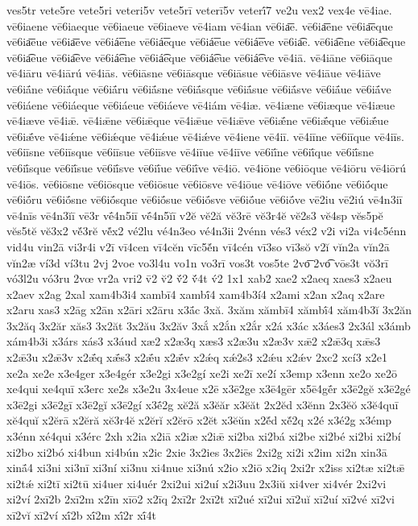 {ves5tr
vete5re
vete5ri
veteri5v
vete5rī
veterī5v
veterī́7
ve2u
vex2
vex4e
vē4iae.
vē6iaene
vē6iaeque
vē6iaeue
vē6iaeve
vē4iam
vē4ian
vē6ia͞e.
vē6ia͞ene
vē6ia͞eque
vē6ia͞eue
vē6ia͞eve
vē6iá͞ene
vē6iá͞eque
vē6iá͞eue
vē6iá͞eve
vē6ia͡e.
vē6ia͡ene
vē6ia͡eque
vē6ia͡eue
vē6ia͡eve
vē6iá͡ene
vē6iá͡eque
vē6iá͡eue
vē6iá͡eve
vē4iā.
vē4iāne
vē6iāque
vē4iāru
vē4iārú
vē4iās.
vē6iāsne
vē6iāsque
vē6iāsue
vē6iāsve
vē4iāue
vē4iāve
vē6iā́ne
vē6iā́que
vē6iā́ru
vē6iā́sne
vē6iā́sque
vē6iā́sue
vē6iā́sve
vē6iā́ue
vē6iā́ve
vē6iáene
vē6iáeque
vē6iáeue
vē6iáeve
vē4iám
vē4iæ.
vē4iæne
vē6iæque
vē4iæue
vē4iæve
vē4iǣ.
vē4iǣne
vē6iǣque
vē4iǣue
vē4iǣve
vē6iǣ́ne
vē6iǣ́que
vē6iǣ́ue
vē6iǣ́ve
vē4iǽne
vē6iǽque
vē4iǽue
vē4iǽve
vē4iene
vē4iī.
vē4iīne
vē6iīque
vē4iīs.
vē6iīsne
vē6iīsque
vē6iīsue
vē6iīsve
vē4iīue
vē4iīve
vē6iī́ne
vē6iī́que
vē6iī́sne
vē6iī́sque
vē6iī́sue
vē6iī́sve
vē6iī́ue
vē6iī́ve
vē4iō.
vē4iōne
vē6iōque
vē4iōru
vē4iōrú
vē4iōs.
vē6iōsne
vē6iōsque
vē6iōsue
vē6iōsve
vē4iōue
vē4iōve
vē6iṓne
vē6iṓque
vē6iṓru
vē6iṓsne
vē6iṓsque
vē6iṓsue
vē6iṓsve
vē6iṓue
vē6iṓve
vē2iu
vē2iú
vē4n3iī
vē4nīs
vē4n3ĭī
vē3r
vḗ4n5iī
vḗ4n5ĭī
v2ĕ
vĕ2ă
vĕ3rē
vĕ3r4ĕ
vĕ2s3
vĕ4sp
vĕs5pĕ
vĕs5tĕ
vĕ3x2
vĕ́3rĕ
vĕ́x2
vé2lu
vé4n3eo
vé4n3ii
2vénn
vés3
véx2
v2i
vi2a
vi4c5énn
vid4u
vin2ā
vi3r4i
v2ī
vī4cen
vī4cĕn
vīc5ĕ́n
vī4cén
vī3so
vī3sŏ
v2ĭ
vĭn2a
vĭn2ā
vĭn2æ
ví3d
ví3tu
2vj
2voe
vo3l4u
vo1n
vo3rī
vos3t
vos5te
2vo͞
2vo͡
vōs3t
vŏ3rī
vó3l2u
vó3ru
2vœ
vr2a
vri2
v̄2
v̆2
v̆́2
v̆́4t
v́2
1x1
xab2
xae2
x2aeq
xaes3
x2aeu
x2aev
x2ag
2xal
xam4b3i4
xambī4
xambī́4
xam4b3í4
x2ami
x2an
x2aq
x2are
x2aru
xas3
x2āg
x2ān
x2āri
x2āru
x3ā́c
3xă.
3xăm
xămbī4
xămbī́4
xăm4b3ĭ
3x2ăn
3x2ăq
3x2ăr
xăs3
3x2ăt
3x2ău
3x2ăv
3xắ
x2ắn
x2ắr
x2á
x3ác
x3áes3
2x3ál
x3ámb
xám4b3i
x3árs
xás3
x3áud
xæ2
x2æ3q
xæs3
x2æ3u
x2æ3v
xǣ2
x2ǣ3q
xǣs3
x2ǣ3u
x2ǣ3v
x2ǣ́q
xǣ́s3
x2ǣ́u
x2ǣ́v
x2ǽq
xǽ2s3
x2ǽu
x2ǽv
2xc2
xcí3
x2e1
xe2a
xe2e
x3e4ger
x3e4gér
x3e2gi
x3e2gí
xe2i
xe2ī
xe2í
x3emp
x3enn
xe2o
xe2ō
xe4qui
xe4quī
x3erc
xe2s
x3e2u
3x4eue
x2ē
x3ē2ge
x3ē4gēr
x5ē4gḗr
x3ē2gĕ
x3ē2gé
x3ē2gi
x3ē2gī
x3ē2gĭ
x3ē2gí
x3ḗ2g
xĕ2ă
x3ĕăr
x3ĕăt
2x2ĕd
x3ĕnn
2x3ĕŏ
x3ĕ4quī
xĕ4quĭ
x2ĕrā
x2ĕră
xĕ3r4ĕ
x2ĕrĭ
x2ĕrō
x2ĕt
x3ĕŭn
x2ĕ́d
xĕ́2q
x2é
x3é2g
x3émp
x3énn
xé4qui
x3érc
2xh
x2ia
x2iā
x2iæ
x2iǣ
xi2ba
xi2bá
xi2be
xi2bé
xi2bi
xi2bí
xi2bo
xi2bó
xi4bun
xi4bún
x2ic
2xie
3x2ies
3x2iēs
2xi2g
xi2i
x2im
xi2n
xin3ā
xinā́4
xi3ni
xi3nī
xi3ní
xi3nu
xi4nue
xi3nú
x2io
x2iō
x2iq
2xi2r
x2iss
xi2tæ
xi2tǣ
xi2tǽ
xi2tī
xi2tū
xi4uer
xi4uér
2xi2ui
xi2uí
x2i3uu
2x3iŭ
xi4ver
xi4vér
2xi2vi
xi2ví
2xī2b
2xī2m
x2īn
xīō2
x2īq
2xī2r
2xī2t
xī2ué
xī2ui
xī2uĭ
xī2uí
xī2vé
xī2vi
xī2vĭ
xī2ví
xī́2b
xī́2m
xī́2r
xī́4t
}
